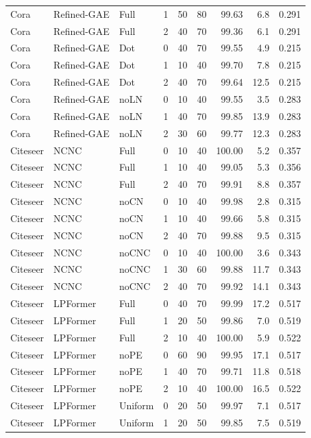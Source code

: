 {\begin{longtable}{lllrrrrrr}
Cora & Refined-GAE & Full & 1 & 50 & 80 & 99.63 & 6.8 & 0.291 \\
Cora & Refined-GAE & Full & 2 & 40 & 70 & 99.36 & 6.1 & 0.291 \\
Cora & Refined-GAE & Dot & 0 & 40 & 70 & 99.55 & 4.9 & 0.215 \\
Cora & Refined-GAE & Dot & 1 & 10 & 40 & 99.70 & 7.8 & 0.215 \\
Cora & Refined-GAE & Dot & 2 & 40 & 70 & 99.64 & 12.5 & 0.215 \\
Cora & Refined-GAE & noLN & 0 & 10 & 40 & 99.55 & 3.5 & 0.283 \\
Cora & Refined-GAE & noLN & 1 & 40 & 70 & 99.85 & 13.9 & 0.283 \\
Cora & Refined-GAE & noLN & 2 & 30 & 60 & 99.77 & 12.3 & 0.283 \\
Citeseer & NCNC & Full & 0 & 10 & 40 & 100.00 & 5.2 & 0.357 \\
Citeseer & NCNC & Full & 1 & 10 & 40 & 99.05 & 5.3 & 0.356 \\
Citeseer & NCNC & Full & 2 & 40 & 70 & 99.91 & 8.8 & 0.357 \\
Citeseer & NCNC & noCN & 0 & 10 & 40 & 99.98 & 2.8 & 0.315 \\
Citeseer & NCNC & noCN & 1 & 10 & 40 & 99.66 & 5.8 & 0.315 \\
Citeseer & NCNC & noCN & 2 & 40 & 70 & 99.88 & 9.5 & 0.315 \\
Citeseer & NCNC & noCNC & 0 & 10 & 40 & 100.00 & 3.6 & 0.343 \\
Citeseer & NCNC & noCNC & 1 & 30 & 60 & 99.88 & 11.7 & 0.343 \\
Citeseer & NCNC & noCNC & 2 & 40 & 70 & 99.92 & 14.1 & 0.343 \\
Citeseer & LPFormer & Full & 0 & 40 & 70 & 99.99 & 17.2 & 0.517 \\
Citeseer & LPFormer & Full & 1 & 20 & 50 & 99.86 & 7.0 & 0.519 \\
Citeseer & LPFormer & Full & 2 & 10 & 40 & 100.00 & 5.9 & 0.522 \\
Citeseer & LPFormer & noPE & 0 & 60 & 90 & 99.95 & 17.1 & 0.517 \\
Citeseer & LPFormer & noPE & 1 & 40 & 70 & 99.71 & 11.8 & 0.518 \\
Citeseer & LPFormer & noPE & 2 & 10 & 40 & 100.00 & 16.5 & 0.522 \\
Citeseer & LPFormer & Uniform & 0 & 20 & 50 & 99.97 & 7.1 & 0.517 \\
Citeseer & LPFormer & Uniform & 1 & 20 & 50 & 99.85 & 7.5 & 0.519 \\

\end{longtable}}
